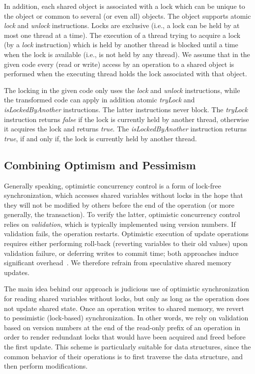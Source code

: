 In addition, each shared object is associated with a lock which can be unique to the object or common to several (or even all) objects. 
The object supports atomic \emph{lock} and \emph{unlock} instructions.
Locks are exclusive (i.e., a lock can be held by at most one thread at a time).
The execution of a thread
trying to acquire a lock (by a \emph{lock} instruction) which is
held by another thread is blocked until a time when the
lock is available (i.e., is not held by any thread).
We assume that in the given code every (read
or write) access by an operation to a shared object is performed when the
executing thread holds the lock associated with that object.


The locking in the given code only uses the \emph{lock} and \emph{unlock} instructions, while the transformed code can apply in addition atomic
\emph{tryLock}  and \emph{isLockedByAnother} instructions.
The latter instructions never block.
The \emph{tryLock} instruction returns \emph{false} if the lock is currently held by another thread, otherwise it acquires the lock and returns \emph{true}.
The \emph{isLockedByAnother} instruction returns \emph{true}, if and only if, the lock is currently held by another thread.


\subsection{Combining Optimism and Pessimism}\label{ssec:overview}

Generally speaking, optimistic concurrency control is a form of lock-free synchronization, which accesses shared variables without locks in the hope that they will not be modified by others before the end of the operation (or more generally, the transaction). To verify the latter, optimistic concurrency control relies on \emph{validation}, which is typically implemented using version numbers. If validation fails, the operation restarts. Optimistic execution of update operations requires either performing roll-back (reverting variables to their old values) upon validation failure, or deferring writes to commit time; both approaches induce significant overhead~\cite{Cascaval:2008}. We therefore refrain from speculative shared memory updates.

The main idea behind our approach is judicious use of optimistic synchronization for reading
shared variables without locks, but only as long as the operation does not update shared state. Once an operation
writes to shared memory, we revert to pessimistic (lock-based) synchronization. In
other words, we rely on validation based on version numbers at the end of the read-only prefix of an operation in order to render redundant
locks that would have been acquired and freed before the first update.
This scheme is particularly suitable for data structures,
since the common behavior of their operations
is to first traverse the data structure, and then
perform modifications.

